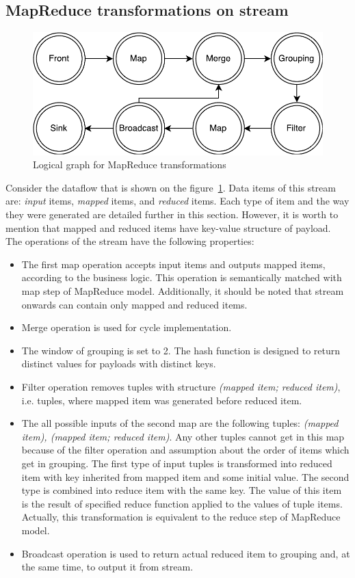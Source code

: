 \subsection{MapReduce transformations on stream}

\begin{figure}[htb]
  \centering
  \includegraphics[scale=0.5]{pics/mapreduce}
  \caption{Logical graph for MapReduce transformations}
  \label {mapreduce-graph-figure}
\end{figure}

Consider the dataflow that is shown on the figure~\ref{mapreduce-graph-figure}. Data items of this stream are: {\it input} items, {\it mapped} items, and {\it reduced} items. Each type of item and the way they were generated are detailed further in this section. However, it is worth to mention that mapped and reduced items have key-value structure of payload. The operations of the stream have the following properties:

\begin{itemize}
\item The first map operation accepts input items and outputs mapped items, according to the business logic. This operation is semantically matched with map step of MapReduce model. Additionally, it should be noted that stream onwards can contain only mapped and reduced items.
\item Merge operation is used for cycle implementation.
\item The window of grouping is set to 2. The hash function is designed to return distinct values for payloads with distinct keys.
\item Filter operation removes tuples with structure \textit{(mapped item; reduced item)}, i.e. tuples, where mapped item was generated before reduced item.
\item The all possible inputs of the second map are the following tuples: \textit{(mapped item), (mapped item; reduced item)}. Any other tuples cannot get in this map because of the filter operation and assumption about the order of items which get in grouping. The first type of input tuples is transformed into reduced item with key inherited from mapped item and some initial value.  The second type is combined into reduce item with the same key. The value of this item is the result of specified reduce function applied to the values of tuple items. Actually, this transformation is equivalent to the reduce step of MapReduce model.
\item Broadcast operation is used to return actual reduced item to grouping and, at the same time, to output it from stream. 
\end{itemize}

